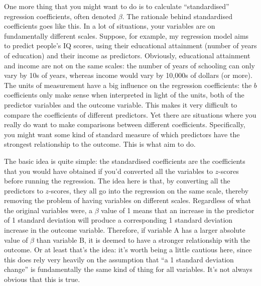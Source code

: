 
One more thing that you might want to do is to calculate ``standardised'' regression coefficients, often denoted $\beta$. The rationale behind standardised coefficients goes like this. In a lot of situations, your variables are on fundamentally different scales. Suppose, for example, my regression model aims to predict people's IQ scores, using their educational attainment (number of years of education) and their income as predictors. Obviously, educational attainment and income are not on the same scales: the number of years of schooling can only vary by 10s of years, whereas income would vary by 10,000s of dollars (or more). The units of measurement have a big influence on the regression coefficients: the $b$ coefficients only make sense when interpreted in light of the units, both of the predictor variables and the outcome variable. This makes it very difficult to compare the coefficients of different predictors. Yet there are situations where you really do want to make comparisons between different coefficients. Specifically, you might want some kind of standard measure of which predictors have the strongest relationship to the outcome. This is what  aim to do. 

The basic idea is quite simple: the standardised coefficients are the coefficients that you would have obtained if you'd converted all the variables to $z$-scores before running the regression.  The idea here is that, by converting all the predictors to $z$-scores, they all go into the regression on the same scale, thereby removing the problem of having variables on different scales. Regardless of what the original variables were, a $\beta$ value of 1 means that an increase in the predictor of 1 standard deviation will produce a corresponding 1 standard deviation increase in the outcome variable. Therefore, if variable A has a larger absolute value of $\beta$ than variable B, it is deemed to have a stronger relationship with the outcome. Or at least that's the idea: it's worth being a little cautious here, since this does rely very heavily on the assumption that ``a 1 standard deviation change'' is fundamentally the same kind of thing for all variables. It's not always obvious that this is true.  


